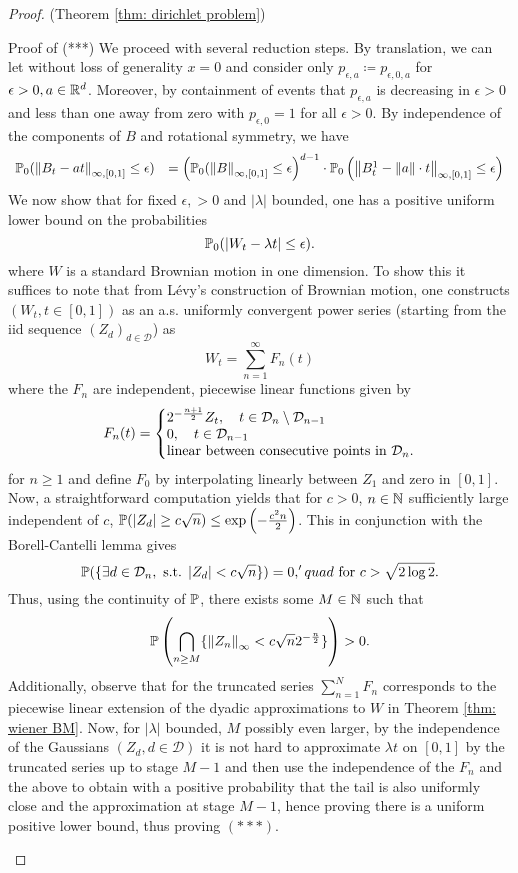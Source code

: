 \documentclass{article}
\begin{document}
\begin{proof}{(Theorem \ref{thm: dirichlet problem})}
\begin{examplesblock}{Proof of (***)}
We proceed with several reduction steps. By translation, we can let without loss of generality $ x=0$ and consider only $ p_{\epsilon,a}\coloneqq p_{\epsilon, 0, a}$ for $ \epsilon>0, a\in \mathbb{R}^{d}$. Moreover, by containment of events that $ p_{\epsilon, a}$ is decreasing in $ \epsilon>0$ and less than one away from zero with $ p_{\epsilon, 0} = 1$ for all $ \epsilon>0$. By independence of the components of $ B$ and rotational symmetry, we have 
\[
\begin{array}{ll}
	\mathbb{P}_{0}(\left\lVert B_{t}-at\right\rVert_{\infty, [0,1]}\leq \epsilon) &= \left(\mathbb{P}_{0}(\left\lVert B\right\rVert_{\infty, [0,1]}\leq \epsilon\right)^{d-1}\cdot \mathbb{P}_{0}\left(\left\lVert B^{1}_{t}-\left\lVert a\right\rVert\cdot t\right\rVert_{\infty, [0,1]}\leq \epsilon\right)\\			      
\end{array}
\]
We now show that for fixed $ \epsilon,  >0$ and $|\lambda|$ bounded, one has a positive uniform lower bound on the probabilities 
\[
\mathbb{P}_{0}(|W_{t}-\lambda t|\leq \epsilon). 
\]
where $ W$ is a standard Brownian motion in one dimension. To show this it suffices to note that from L\'{e}vy's construction of Brownian motion, one constructs $ (W_{t}, t\in [0,1])$ as an a.s. uniformly convergent power series (starting from the iid sequence $ (Z_{d})_{d\in \mathcal{D}}$) as 
\[
W_{t} =\displaystyle\sum^{\infty}_{n=1}F_{n}(t) 
\]
where the $ F_{n}$ are independent, piecewise linear functions given by 
\[
F_{n}(t) = \left\lbrace
\begin{array}{@{}l@{}}
	2^{-\frac{n+1}{2}}Z_{t}, \quad t\in \mathcal{D}_{n}\setminus \mathcal{D}_{n-1} \\
    0, \quad t\in \mathcal{D}_{n-1}\\ 
    \text{linear between consecutive points in } \mathcal{D}_{n}.
\end{array}\right.
\]
for $ n\geq 1$ and define $ F_{0}$ by interpolating linearly between $ Z_{1} $ and zero in $ [0,1]$. Now, a straightforward computation yields that for $c>0 $, $ n\in \mathbb{N}$ sufficiently large independent of $ c$, $\mathbb{P}(|Z_{d}|\geq c\sqrt{n})\leq \exp \left( -\frac{c^{2}n}{2} \right) $. This in conjunction with the Borell-Cantelli lemma gives 
\[
	\mathbb{P}(\{\exists d\in \mathcal{D}_{n}, \text{ s.t. } |Z_{d}|<c\sqrt{n}\}) = 0, 'quad \text{ for }c>\sqrt{2\log 2}.
\]
Thus, using the continuity of $ \mathbb{P}$, there exists some $ M\in \mathbb{N}$ such that 
\[
	\mathbb{P} \left( \displaystyle\bigcap_{n\geq M} \{\left\lVert Z_{n}\right\rVert_{\infty}< c\sqrt{n}2^{-\frac{n}{2}}\} \right) > 0.
\]
Additionally, observe that for the truncated series $ \sum_{n=1}^{N} F_{n}$ corresponds to the piecewise linear extension of the dyadic approximations to $ W$ in Theorem \ref{thm: wiener BM}. Now, for $ |\lambda|$ bounded, $ M$ possibly even larger,  by the independence of the Gaussians $ (Z_{d}, d\in \mathcal{D})$ it is not hard to approximate $ \lambda t$ on $ [0,1]$ by the truncated series up to stage $ M-1$ and then use the independence of the $ F_{n}$ and the above to obtain with a positive probability that the tail is also uniformly close and the approximation at stage $ M-1$, hence proving there is a uniform positive lower bound, thus proving $ (***)$. \\ 

\end{examplesblock}
\end{proof}
\end{document}
